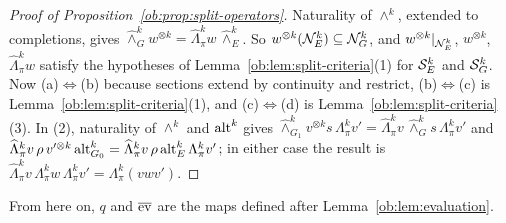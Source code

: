 \begin{proof}[Proof of Proposition~\ref{ob:prop:split-operators}]
Naturality of $\wedge^k$, extended to completions, gives
$\widehat\wedge^k_Gw^{\otimes k}=\widehat\Lambda^k_\pi w\,\widehat\wedge^k_E$. So $w^{\otimes k}(\mathcal N^k_E)\subseteq\mathcal N^k_G$,
and $w^{\otimes k}|_{\mathcal N^k_E}$, $w^{\otimes k}$, $\widehat\Lambda^k_\pi w$ satisfy the hypotheses of
Lemma~\ref{ob:lem:split-criteria}(1) for $\mathcal S^k_E$ and $\mathcal S^k_G$. Now (a)$\Leftrightarrow$(b) because sections extend by
continuity and restrict, (b)$\Leftrightarrow$(c) is Lemma~\ref{ob:lem:split-criteria}(1), and (c)$\Leftrightarrow$(d)
is Lemma~\ref{ob:lem:split-criteria}(3). In (2), naturality of $\wedge^k$ and $\operatorname{alt}^k$ gives
$\widehat\wedge^k_{G_1}v^{\otimes k}s\,\Lambda^k_\pi v'=\widehat\Lambda^k_\pi v\,\widehat\wedge^k_Gs\,\Lambda^k_\pi v'$ and
$\widehat\Lambda^k_\pi v\,\rho\,v'^{\otimes k}\operatorname{alt}^k_{G_0}=\widehat\Lambda^k_\pi v\,\rho\operatorname{alt}^k_E\Lambda^k_\pi v'$; in
either case the result is $\widehat\Lambda^k_\pi v\,\Lambda^k_\pi w\,\Lambda^k_\pi v'=\Lambda^k_\pi(vwv')$.
\end{proof}

From here on, $q$ and $\overline{\operatorname{ev}}$ are the maps defined after Lemma~\ref{ob:lem:evaluation}.

